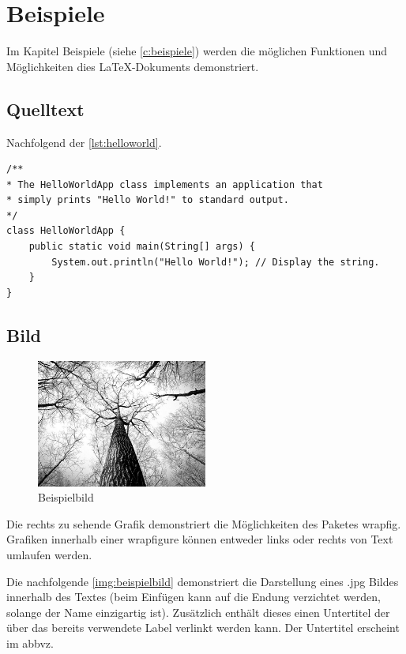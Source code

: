 \chapter{Beispiele} \label{c:beispiele}


Im Kapitel Beispiele (siehe \autoref{c:beispiele}) werden die möglichen Funktionen und Möglichkeiten dies LaTeX-Dokuments demonstriert.

\section{Quelltext}

Nachfolgend der \autoref{lst:helloworld}.

\begin{lstlisting}[caption={Hello World}, captionpos=b, label={lst:helloworld}]
/**
* The HelloWorldApp class implements an application that
* simply prints "Hello World!" to standard output.
*/
class HelloWorldApp {
	public static void main(String[] args) {
		System.out.println("Hello World!"); // Display the string.
	}
}
\end{lstlisting}

\section{Bild}

\begin{figure}
	\centering
	\includegraphics[width=0.5\textwidth]{resources/example}
	\caption{Beispielbild {\cite{PEXELS2015}}}
\end{figure}

Die rechts zu sehende Grafik demonstriert die Möglichkeiten des Paketes \glqq wrapfig\grqq . Grafiken innerhalb einer \glqq wrapfigure\grqq{} können entweder links oder rechts von Text umlaufen werden.

Die nachfolgende \autoref{img:beispielbild} demonstriert die Darstellung eines \glqq *.jpg\grqq{} Bildes innerhalb des Textes (beim Einfügen kann auf die Endung verzichtet werden, solange der Name einzigartig ist). Zusätzlich enthält dieses einen Untertitel der über das bereits verwendete Label verlinkt werden kann. Der Untertitel erscheint im \gls{abbvz}.

